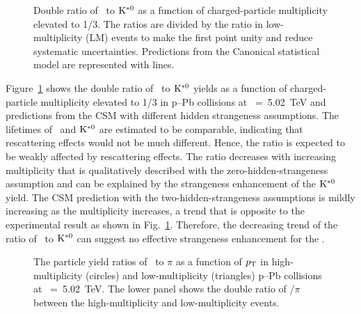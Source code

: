 \begin{figure}[!hbt]
	\centering
	\caption{ Double ratio of \fzero~to $\rm{}K^{*0}$ as a function of charged-particle multiplicity elevated to 1/3. The ratios are divided by the ratio in low-multiplicity (LM) events to make the first point unity and reduce systematic uncertainties. Predictions from the Canonical statistical model are represented with lines. }
	\label{fig:f0KSAddCSM}
\end{figure}

Figure~\ref{fig:f0KSAddCSM} shows the double ratio of \fzero~to $\rm{}K^{*0}$ yields as a function of charged-particle multiplicity elevated to 1/3 in p--Pb collisions at \snn~=~5.02~TeV and predictions from the CSM with different hidden strangeness assumptions. The lifetimes of \fzero~and $\rm{}K^{*0}$ are estimated to be comparable, indicating that rescattering effects would not be much different. Hence, the ratio is expected to be weakly affected by rescattering effects. The ratio decreases with increasing multiplicity that is qualitatively described with the zero-hidden-strangeness assumption and can be explained by the strangeness enhancement of the $\rm{}K^{*0}$ yield. The CSM prediction with the two-hidden-strangeness assumptions is mildly increasing as the multiplicity increases, a trend that is opposite to the experimental result as shown in Fig.~\ref{fig:f0KSAddCSM}. Therefore, the decreasing trend of the ratio of \fzero~to $\rm{}K^{*0}$ can suggest no effective strangeness enhancement for the \fzero.

\begin{figure}[!hbt]
	\centering
	\caption{ The particle yield ratios of \fzero~to $\pi$ as a function of $p_{\rm{T}}$ in high-multiplicity (circles) and low-multiplicity (triangles) p--Pb collisions at \snn~=~5.02~TeV. The lower panel shows the double ratio of \fzero/$\pi$ between the high-multiplicity and low-multiplicity events. }
	\label{fig:f0piPt}
\end{figure}

